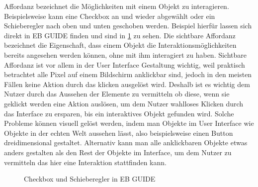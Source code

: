 Affordanz bezeichnet die Möglichkeiten mit einem Objekt zu interagieren. Beispielsweise kann eine Checkbox an und wieder abgewählt oder ein Schieberegler nach oben und unten geschoben werden.
Beispiel hierfür lassen sich direkt in EB GUIDE finden und sind in \cref{fig:Checkbox} zu sehen.
Die sichtbare Affordanz bezeichnet die Eigenschaft, dass einem Objekt die Interaktionsmöglichkeiten bereits angesehen werden können, ohne mit ihm interagiert zu haben.
Sichtbare Affordanz ist vor allem in der User Interface Gestaltung wichtig, weil praktisch betrachtet alle Pixel auf einem Bildschirm anklickbar sind, jedoch in den meisten Fällen keine Aktion durch das klicken ausgelöst wird.
Deshalb ist es wichtig dem Nutzer durch das Aussehen der Elemente zu vermitteln ob diese, wenn sie geklickt werden eine Aktion auslösen, um dem Nutzer wahlloses Klicken durch das Interface zu ersparen, bis ein interaktives Objekt gefunden wird.
Solche Probleme können visuell gelöst werden, indem man Objekte im User Interface wie Objekte in der echten Welt aussehen lässt, also beispielsweise einen Button dreidimensional gestaltet.
Alternativ kann man alle anklickbaren Objekte etwas anders gestalten als den Rest der Objekte im Interface, um dem Nutzer zu vermitteln das hier eine Interaktion stattfinden kann\cite{Knight.2019c}.

\begin{figure}[H]
\centering
{}%
\qquad
{}%
\caption{Checkbox und Schieberegler in EB GUIDE}%
\label{fig:Checkbox}
\end{figure}

